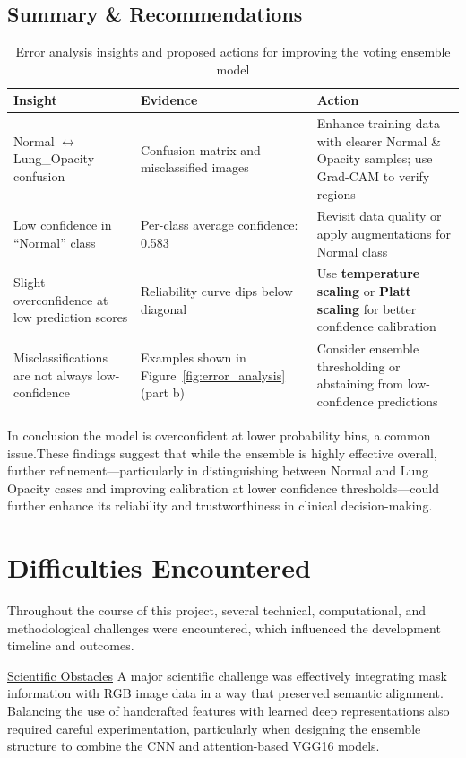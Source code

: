 \documentclass{article}
\begin{document}
\subsection{Summary \& Recommendations}
\begin{table}[ht]
\centering
\renewcommand{\arraystretch}{1.4}
\begin{tabular}{|p{4.5cm}|p{4.5cm}|p{5.5cm}|}
\hline
\textbf{Insight} & \textbf{Evidence} & \textbf{Action} \\
\hline
Normal $\leftrightarrow$ Lung\_Opacity confusion & Confusion matrix and misclassified images & Enhance training data with clearer Normal \& Opacity samples; use Grad-CAM to verify regions \\
\hline
Low confidence in ``Normal'' class & Per-class average confidence: 0.583 & Revisit data quality or apply augmentations for Normal class \\
\hline
Slight overconfidence at low prediction scores & Reliability curve dips below diagonal & Use \textbf{temperature scaling} or \textbf{Platt scaling} for better confidence calibration \\
\hline
Misclassifications are not always low-confidence & Examples shown in Figure~\ref{fig:error_analysis} (part b) & Consider ensemble thresholding or abstaining from low-confidence predictions \\
\hline
\end{tabular}
\caption{Error analysis insights and proposed actions for improving the voting ensemble model}
\label{tab:error_actions}
\end{table}


In conclusion the model is overconfident at lower probability bins, a common issue.These findings suggest that while the ensemble is highly effective overall, further refinement—particularly in distinguishing between Normal and Lung Opacity cases and improving calibration at lower confidence thresholds—could further enhance its reliability and trustworthiness in clinical decision-making.\\

\section{Difficulties Encountered}

Throughout the course of this project, several technical, computational, and methodological challenges were encountered, which influenced the development timeline and outcomes.

\underline{Scientific Obstacles}
A major scientific challenge was effectively integrating mask information with RGB image data in a way that preserved semantic alignment. Balancing the use of handcrafted features with learned deep representations also required careful experimentation, particularly when designing the ensemble structure to combine the CNN and attention-based VGG16 models.
\end{document}

